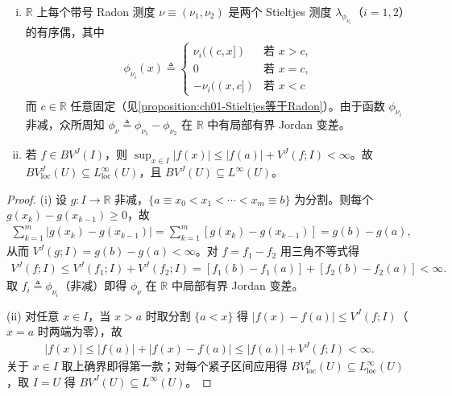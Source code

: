 \documentclass[../../main.tex]{subfiles}%
\begin{document}
\begin{remark}\label{remark:ch03-Stieltjes}
\begin{enumerate}[(i)]
\item $\mathbb{R}$ 上每个带号 Radon 测度 $\nu\equiv(\nu_1,\nu_2)$ 是两个 Stieltjes 测度 $\lambda_{\phi_{\nu_i}}$（$i=1,2$）的有序偶，其中
\begin{align*}
\phi_{\nu_i}(x)\triangleq\begin{cases}
\nu_i((c,x]) & \text{若 }x>c,\\
0 & \text{若 }x=c,\\
-\nu_i((x,c]) & \text{若 }x<c
\end{cases}
\end{align*}
而 $c\in\mathbb{R}$ 任意固定（见\cref{proposition:ch01-Stieltjes等于Radon}）。由于函数 $\phi_{\nu_i}$ 非减，众所周知 $\phi_\nu\triangleq\phi_{\nu_1}-\phi_{\nu_2}$ 在 $\mathbb{R}$ 中有局部有界 Jordan 变差。
\item 若 $f\in BV^J(I)$，则 $\sup_{x\in I}|f(x)|\leqslant|f(a)|+V^J(f;I)<\infty$。故 $BV^J_{\mathrm{loc}}(U)\subseteq L^\infty_{\mathrm{loc}}(U)$，且 $BV^J(U)\subseteq L^\infty(U)$。
\end{enumerate}
\end{remark}

\begin{proof}
(i) 设 $g:I\to\mathbb{R}$ 非减，$\{a\equiv x_0<x_1<\cdots<x_m\equiv b\}$ 为分割。则每个 $g(x_k)-g(x_{k-1})\geqslant0$，故
\begin{align*}
\sum_{k=1}^m|g(x_k)-g(x_{k-1})|=\sum_{k=1}^m[g(x_k)-g(x_{k-1})]=g(b)-g(a),
\end{align*}
从而 $V^J(g;I)=g(b)-g(a)<\infty$。对 $f=f_1-f_2$ 用三角不等式得
\begin{align*}
V^J(f;I)\leqslant V^J(f_1;I)+V^J(f_2;I)=[f_1(b)-f_1(a)]+[f_2(b)-f_2(a)]<\infty.
\end{align*}
取 $f_i\triangleq\phi_{\nu_i}$（非减）即得 $\phi_\nu$ 在 $\mathbb{R}$ 中局部有界 Jordan 变差。

(ii) 对任意 $x\in I$，当 $x>a$ 时取分割 $\{a<x\}$ 得 $|f(x)-f(a)|\leqslant V^J(f;I)$（$x=a$ 时两端为零），故
\begin{align*}
|f(x)|\leqslant|f(a)|+|f(x)-f(a)|\leqslant|f(a)|+V^J(f;I)<\infty.
\end{align*}
关于 $x\in I$ 取上确界即得第一款；对每个紧子区间应用得 $BV^J_{\mathrm{loc}}(U)\subseteq L^\infty_{\mathrm{loc}}(U)$，取 $I=U$ 得 $BV^J(U)\subseteq L^\infty(U)$。
\end{proof}
\end{document}
